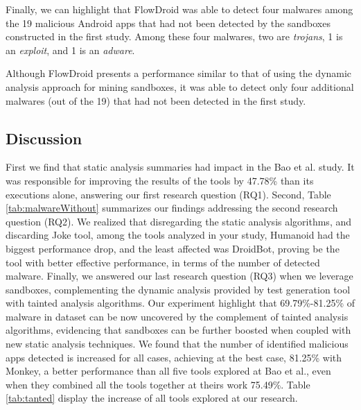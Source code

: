 Finally, we can highlight that FlowDroid was able to detect four malwares among the 19 malicious Android apps that had not
been detected by the sandboxes constructed in the first study. Among these
four malwares, two are \emph{trojans}, 1 is an \emph{exploit}, and 1
is an \emph{adware}.

\begin{finding}
  Although FlowDroid presents a performance similar
  to that of using the dynamic analysis approach for mining sandboxes,
  it was able to detect only four additional malwares (out of the
  19) that had not been detected in the first study. 
\end{finding}




\subsection{Discussion}\label{sec:discussion}

First we find that static analysis summaries had impact in the Bao et al. study. It was responsible for improving the results of the tools by 47.78\% than its executions alone, answering our first research question (RQ1). Second, Table \ref{tab:malwareWithout} summarizes our findings addressing the second research question (RQ2). We realized that disregarding the static analysis algorithms, and discarding Joke tool, among the tools analyzed in your study, Humanoid had the biggest performance drop, and the least affected was DroidBot, proving be the tool with better effective performance, in terms of the number of detected malware. Finally, we answered our last research question (RQ3) when we leverage sandboxes, complementing the dynamic analysis provided by test generation tool with tainted analysis algorithms. Our experiment highlight that 69.79\%-81.25\% of malware in dataset can be now uncovered by the complement of tainted analysis algorithms, evidencing that 
sandboxes can be further boosted when coupled with new static analysis techniques. We found that the number of identified malicious apps detected is increased for all cases, achieving at the best case, 81.25\% with Monkey, a better performance than all five tools explored at Bao et al., even when they combined all the tools together at theirs work 75.49\%. Table \ref{tab:tanted} display the increase of all tools explored at our research.

